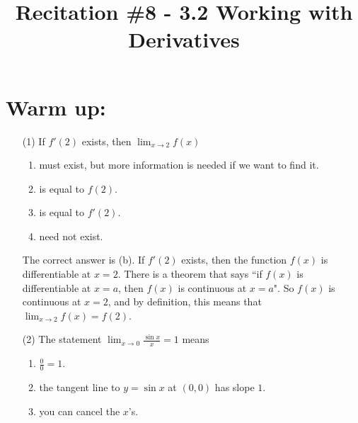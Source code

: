 \documentclass[handout,nooutcomes]{ximera}
\title{Recitation \#8 - 3.2 Working with Derivatives}
\begin{document}
\begin{abstract}		\end{abstract}
\maketitle

\section*{Warm up:} 
	
	\begin{enumerate}
	
	\item[(1)] If $f'(2)$ exists, then $\lim_{x \to 2} f(x)$
	
		\begin{enumerate}
		
		\item must exist, but more information is needed if we want to find it.
		
		\item is equal to $f(2)$.
		
		\item is equal to $f'(2)$.
		
		\item need not exist.
		
		\end{enumerate}
	
			\begin{freeResponse}
			The correct answer is (b).  If $f'(2)$ exists, then the function $f(x)$ is differentiable at $x=2$.  There is a theorem that says ``if $f(x)$ is differentiable at $x=a$, then $f(x)$ is continuous at $x=a$".  So $f(x)$ is continuous at $x=2$, and by definition, this means that $\lim_{x \to 2} f(x) = f(2)$.
			\end{freeResponse}
	
	\item[(2)] The statement $\lim_{x \to 0} \frac{\sin x}{x} = 1$ means
	
		\begin{enumerate}
		
		\item $\frac{0}{0} = 1$.
		
		\item the tangent line to $y = \sin x$ at $(0,0)$ has slope $1$.
		
		\item you can cancel the $x$'s.
		

\end{enumerate}
\end{enumerate}
\end{document}
